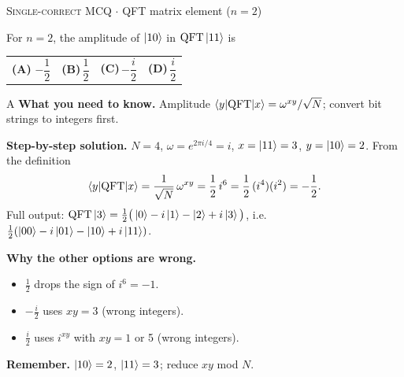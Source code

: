 \documentclass[11pt,a4paper]{article}
\newcommand{\optlabel}[1]{\textbf{(#1)}}
\newcommand{\correctlabel}[1]{\textcolor{okgreen}{\textbf{(#1)}\,\ding{51}}}
\newenvironment{qitem}[1]{\begin{list}{}{\setlength{\leftmargin}{3.3em}\setlength{\labelwidth}{3.1em}%
  \setlength{\labelsep}{0.2em}\setlength{\topsep}{3pt}\setlength{\parsep}{3pt}}\item[\textbf{Q.#1}\hfill]}{\end{list}}
\newcommand{\qsep}{\par\vspace{2pt}{\color{black!15}\hrule}\vspace{4pt}}
\newcommand{\qmeta}[2]{{\footnotesize\color{black!60}\textsc{#1} \;$\cdot$\; #2}\par}
\newcommand{\QFTop}{\mathrm{QFT}}
\begin{document}
\begin{qitem}{41}
\qmeta{Single-correct MCQ}{QFT matrix element ($n = 2$)}
For $n = 2$, the amplitude of $\ket{10}$ in $\mathrm{QFT}\ket{11}$ is
\par\smallskip\noindent\begin{tabularx}{\linewidth}{@{}*{4}{L}@{}}
\correctlabel{A}\,$-\dfrac12$ & \optlabel{B}\,$\dfrac12$ & \optlabel{C}\,$-\dfrac{i}{2}$ & \optlabel{D}\,$\dfrac{i}{2}$
\end{tabularx}
\end{qitem}
\begin{solbox}{A}
\textbf{\color{brand}What you need to know.} Amplitude $\braket{y|\QFTop|x} = \omega^{xy}/\sqrt N$; convert bit strings to integers first.

\textbf{\color{brand}Step-by-step solution.} $N = 4$, $\omega = e^{2\pi i/4} = i$, $x = \ket{11} = 3$, $y = \ket{10} = 2$. From the definition
\[ \braket{y|\mathrm{QFT}|x} = \frac{1}{\sqrt N}\,\omega^{xy} = \frac12\, i^{6} = \frac12\,(i^4)(i^2) = -\frac12 . \]
Full output: $\mathrm{QFT}\ket{3} = \frac12\big(\ket0 - i\ket1 - \ket2 + i\ket3\big)$, i.e.\ $\frac12(\ket{00} - i\ket{01} - \ket{10} + i\ket{11})$.

\textbf{\color{brand}Why the other options are wrong.}
\begin{itemize}[leftmargin=2.4em, itemsep=1pt, topsep=2pt]
\item[\textbf{(B)}] $\frac12$ drops the sign of $i^6 = -1$.
\item[\textbf{(C)}] $-\frac{i}{2}$ uses $xy = 3$ (wrong integers).
\item[\textbf{(D)}] $\frac{i}{2}$ uses $i^{xy}$ with $xy = 1$ or 5 (wrong integers).
\end{itemize}
\textbf{\color{brand}Remember.} $\ket{10} = 2$, $\ket{11} = 3$; reduce $xy$ mod $N$.
\end{solbox}
\qsep
\end{document}
